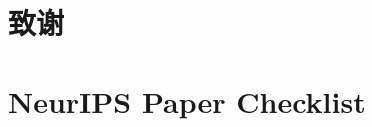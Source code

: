 \documentclass[11pt,a4paper,fontset=fandol]{ctexart}
\begin{document}

\section*{致谢}




\newpage


\section*{NeurIPS Paper Checklist}
\end{document}
